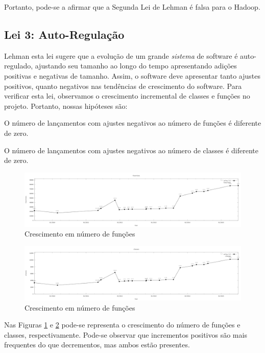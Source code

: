 Portanto, pode-se a afirmar que a Segunda Lei de Lehman é falsa para o Hadoop.

\subsection{Lei 3: Auto-Regulação}
Lehman esta lei sugere que a evolução de um grande \textit{sistema} de software é auto-regulado, ajustando seu tamanho ao longo do tempo apresentando adições positivas e negativas de tamanho. Assim, o software deve apresentar tanto ajustes positivos, quanto negativos nas tendências de crescimento do software. Para verificar esta lei, observamos o crescimento incremental de classes e funções no projeto. Portanto, nossas hipóteses são:
\begin{hypothesis}
	O número de lançamentos com ajustes negativos ao número de funções é diferente de zero.
\end{hypothesis}
\begin{hypothesis}
	O número de lançamentos com ajustes negativos ao número de classes é diferente de zero.
\end{hypothesis}

\begin{figure}
	\centering
	\includegraphics[width=0.7\linewidth]{figure/functions}
	\caption{Crescimento em número de funções}
	\label{fig:function_growth}
\end{figure}

\begin{figure}
	\centering
	\includegraphics[width=0.7\linewidth]{figure/classes}
	\caption{Crescimento em número de funções}
	\label{fig:classes_growth}
\end{figure}

Nas Figuras \ref{fig:function_growth} e \ref{fig:classes_growth} pode-se representa o crescimento do número de funções e classes,  respectivamente. Pode-se observar que incrementos positivos são mais frequentes do que decrementos, mas ambos estão presentes.

